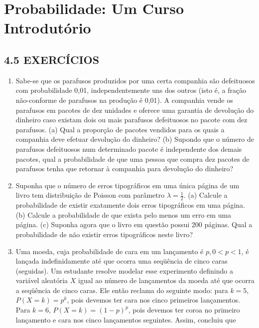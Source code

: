 \documentclass[
  10pt,
]{article}
\author{}
\date{\vspace{-2.5em}}
\begin{document}
\section{Probabilidade: Um Curso
Introdutório}\label{probabilidade-um-curso-introdutuxf3rio}

\subsection{4.5 EXERCÍCIOS}\label{exercuxedcios}

\begin{enumerate}
\def\labelenumi{\arabic{enumi}.}
\item
  Sabe-se que os parafusos produzidos por uma certa companhia são
  defeituosos com probabilidade 0,01, independentemente uns dos outros
  (isto é, a fração não-conforme de parafusos na produção é 0,01). A
  companhia vende os parafusos em pacotes de dez unidades e oferece uma
  garantia de devolução do dinheiro caso existam dois ou mais parafusos
  defeituosos no pacote com dez parafusos. (a) Qual a proporção de
  pacotes vendidos para os quais a companhia deve efetuar devolução do
  dinheiro? (b) Supondo que o número de parafusos defeituosos num
  determinado pacote é independente dos demais pacotes, qual a
  probabilidade de que uma pessoa que compra dez pacotes de parafusos
  tenha que retornar à companhia para devolução do dinheiro?
\item
  Suponha que o número de erros tipográficos em uma única página de um
  livro tem distribuição de Poisson com parâmetro
  \(\lambda = \frac{1}{2}\). (a) Calcule a probabilidade de existir
  exatamente dois erros tipográficos em uma página. (b) Calcule a
  probabilidade de que exista pelo menos um erro em uma página. (c)
  Suponha agora que o livro em questão possui 200 páginas. Qual a
  probabilidade de não existir erros tipográficos neste livro?
\item
  Uma moeda, cuja probabilidade de cara em um lançamento é
  \(p, 0 < p < 1\), é lançada indefinidamente até que ocorra uma
  seqüência de cinco caras (seguidas). Um estudante resolve modelar esse
  experimento definindo a variável aleatória \(X\) igual ao número de
  lançamentos da moeda até que ocorra a seqüência de cinco caras. Ele
  então reclama do seguinte modo: para \(k = 5\), \(P(X = k) = p^k\),
  pois devemos ter cara nos cinco primeiros lançamentos. Para \(k = 6\),
  \(P(X = k) = (1 - p)^p\), pois devemos ter coroa no primeiro
  lançamento e cara nos cinco lançamentos seguintes. Assim, concluiu
  que\\

\end{enumerate}
\end{document}

